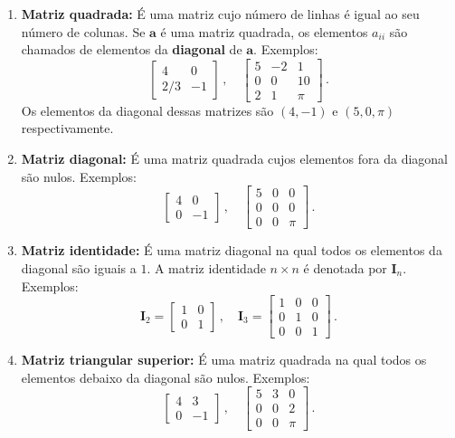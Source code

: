 \documentclass[12pt,a4paper]{report}
\newcommand{\mb}{\mathbf}
\begin{document}
\begin{enumerate}
  \item \textbf{Matriz quadrada:} É uma matriz cujo número de linhas é igual ao seu número de colunas. Se $\mb{a}$ é uma matriz quadrada, os elementos $a_{ii}$ são chamados de elementos da \textbf{diagonal} de $\mb{a}$. Exemplos:
  $$\begin{bmatrix}
    4&0\\
    2/3&-1
  \end{bmatrix}\,,\quad \begin{bmatrix}
    5&-2&1\\
    0&0&10\\
    2&1&\pi
  \end{bmatrix}\,.$$
  Os elementos da diagonal dessas matrizes são $(4,-1)$ e $(5,0,\pi)$ respectivamente.
  \item \textbf{Matriz diagonal:} É uma matriz quadrada cujos elementos fora da diagonal são nulos. Exemplos:
  $$\begin{bmatrix}
    4&0\\
    0&-1
  \end{bmatrix}\,,\quad \begin{bmatrix}
    5&0&0\\
    0&0&0\\
    0&0&\pi
  \end{bmatrix}\,.$$
  \item \textbf{Matriz identidade:} É uma matriz diagonal na qual todos os elementos da diagonal são iguais a $1$. A matriz identidade $n\times n$ é denotada por $\mb{I}_n$. Exemplos:
  $$\mb{I}_2=\begin{bmatrix}
    1&0\\
    0&1
  \end{bmatrix}\,,\quad \mb{I}_3=\begin{bmatrix}
    1&0&0\\
    0&1&0\\
    0&0&1
  \end{bmatrix}\,.$$
  \item \textbf{Matriz triangular superior:} É uma matriz quadrada na qual todos os elementos debaixo da diagonal são nulos. Exemplos:
  $$\begin{bmatrix}
    4&3\\
    0&-1
  \end{bmatrix}\,,\quad \begin{bmatrix}
    5&3&0\\
    0&0&2\\
    0&0&\pi
  \end{bmatrix}\,.$$

\end{enumerate}
\end{document}
